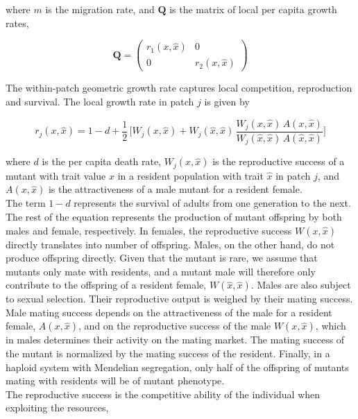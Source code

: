 where $m$ is the migration rate, and $\pmb{Q}$ is the matrix of local per capita growth rates,

\begin{equation}
    \pmb{Q} =
    \begin{pmatrix}
        r_1(x, \hat{x}) & 0 \\
        0 & r_2(x, \hat{x})
    \end{pmatrix}
\end{equation}

The within-patch geometric growth rate captures local competition, reproduction and survival. The local growth rate in patch $j$ is given by

\begin{equation}
    r_j(x, \hat{x}) = 1 - d + \frac{1}{2} \, \Bigg[ W_j(x, \hat{x}) + W_j(\hat{x}, \hat{x}) \, \frac{W_j(x, \hat{x})\,A(x,\hat{x})}{W_j(\hat{x}, \hat{x})\,A(\hat{x},\hat{x})}\Bigg]
    \label{eq:growth_rate}
\end{equation}

where $d$ is the per capita death rate, $W_j(x,\hat{x})$ is the reproductive success of a mutant with trait value $x$ in a resident population with trait $\hat{x}$ in patch $j$, and $A(x, \hat{x})$ is the attractiveness of a male mutant for a resident female.\\

The term $1-d$ represents the survival of adults from one generation to the next. The rest of the equation represents the production of mutant offspring by both males and female, respectively. In females, the reproductive success $W(x, \hat{x})$ directly translates into number of offspring. Males, on the other hand, do not produce offspring directly. Given that the mutant is rare, we assume that mutants only mate with residents, and a mutant male will therefore only contribute to the offspring of a resident female, $W(\hat{x}, \hat{x})$. Males are also subject to sexual selection. Their reproductive output is weighed by their mating success. Male mating success depends on the attractiveness of the male for a resident female, $A(x, \hat{x})$, and on the reproductive success of the male $W(x, \hat{x})$, which in males determines their activity on the mating market. The mating success of the mutant is normalized by the mating success of the resident. Finally, in a haploid system with Mendelian segregation, only half of the offspring of mutants mating with residents will be of mutant phenotype.\\

The reproductive success is the competitive ability of the individual when exploiting the resources,


